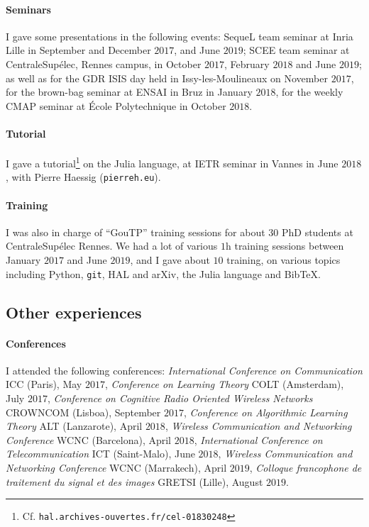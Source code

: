 \paragraph{Seminars} I gave some presentations in the following events:
    SequeL team seminar at Inria Lille in September and December $2017$, and June $2019$;
    SCEE team seminar at CentraleSupélec, Rennes campus, in October $2017$, February $2018$ and June $2019$;
    as well as
    for the GDR ISIS day held in Issy-les-Moulineaux on November $2017$,
    for the brown-bag seminar at ENSAI in Bruz in January $2018$,
    for the weekly CMAP seminar at École Polytechnique in October $2018$.

\paragraph{Tutorial}
    I gave a tutorial\footnote{Cf. \texttt{hal.archives-ouvertes.fr/cel-01830248}} on the Julia language, at IETR seminar in Vannes in June $2018$,
    with Pierre Haessig (\texttt{pierreh.eu}).

\paragraph{Training}
    I was also in charge of ``GouTP'' training sessions for about $30$ PhD students at CentraleSupélec Rennes.
    We had a lot of various $1$h training sessions between January $2017$ and June $2019$,
    and I gave about $10$ training, on various topics including Python, \texttt{git}, HAL and arXiv, the Julia language and Bib\TeX{}.


\subsection{Other experiences}

\paragraph{Conferences} I attended the following conferences:
	\emph{International Conference on Communication} ICC (Paris), May $2017$,
    \emph{Conference on Learning Theory} COLT (Amsterdam), July $2017$,
    \emph{Conference on Cognitive Radio Oriented Wireless Networks} CROWNCOM (Lisboa), September $2017$,
    \emph{Conference on Algorithmic Learning Theory} ALT (Lanzarote), April $2018$,
    \emph{Wireless Communication and Networking Conference} WCNC (Barcelona), April $2018$,
	\emph{International Conference on Telecommunication} ICT (Saint-Malo), June $2018$,
    \emph{Wireless Communication and Networking Conference} WCNC (Marrakech), April $2019$,
    \emph{Colloque francophone de traitement du signal et des images} GRETSI (Lille), August $2019$.

